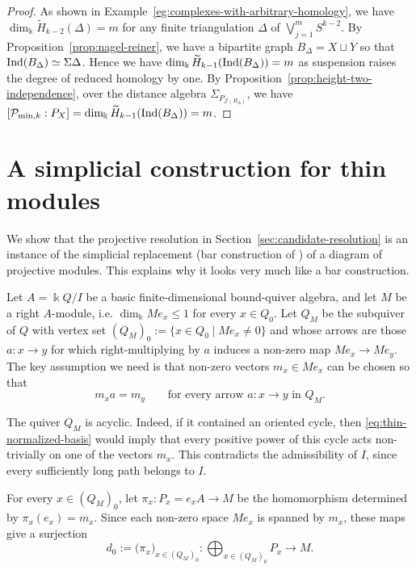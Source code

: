 \documentclass[a4paper,leqno]{amsart}
\begin{document}
\begin{proof}
As shown in Example~\ref{eg:complexes-with-arbitrary-homology}, we have $\dim_{\Bbbk}\widetilde H_{k-2}(\Delta)=m$ for any finite triangulation $\Delta$ of $\bigvee_{j=1}^m S^{k-2}$.  By Proposition~\ref{prop:nagel-reiner}, we have a bipartite graph $B_\Delta=X\sqcup Y$ so that $\operatorname{Ind}(B_\Delta)\simeq \Sigma \Delta$.  
Hence we have $\dim_{\Bbbk}\widetilde H_{k-1}(\operatorname{Ind}(B_\Delta))=m$ as suspension raises the degree of reduced homology by one. 
By Proposition~\ref{prop:height-two-independence}, over the distance algebra $\Sigma_{P_{\mathcal{J}(B_\Delta)}}$, we have $[\mathcal P_{\min,k}:P_X]=\dim_{\Bbbk}\widetilde H_{k-1}(\operatorname{Ind}(B_\Delta))=m$.
\end{proof}

\appendix

\section{A simplicial construction for thin modules}
\label{app:thin-modules}

We show that the projective resolution in Section~\ref{sec:candidate-resolution} is an instance of the simplicial replacement (bar construction of \cite[Definition 4.2.1]{Rie14}) of a diagram of projective modules.
This explains why it looks very much like a bar construction. 

Let $A=\Bbbk Q/I$ be a basic finite-dimensional bound-quiver algebra, and let $M$ be a  right $A$-module, i.e. $\dim_{\Bbbk}Me_x\leq1$ for every $x\in Q_0$.  Let $Q_M$ be the subquiver of $Q$ with vertex set $(Q_M)_0:=\{x\in Q_0\mid Me_x\neq0\}$ and whose arrows are those $a:x\to y$ for which right-multiplying by $a$ induces a non-zero map $Me_x\to Me_y$.  The key assumption we need is that non-zero vectors $m_x\in Me_x$ can be chosen so that
\begin{equation}
m_x a=m_y
\qquad
\text{for every arrow $a:x\to y$ in $Q_M$}.
\label{eq:thin-normalized-basis}
\end{equation}

The quiver $Q_M$ is acyclic.  Indeed, if it contained an oriented cycle, then \eqref{eq:thin-normalized-basis} would imply that every positive power of this cycle acts non-trivially on one of the vectors $m_x$.  This contradicts the admissibility of $I$, since every sufficiently long path belongs to $I$.

For every $x\in(Q_M)_0$, let $\pi_x\colon P_x=e_xA\to M$ be the homomorphism determined by $\pi_x(e_x)=m_x$.  Since each non-zero space $Me_x$ is spanned by $m_x$, these maps give a surjection
\begin{equation}\label{eq: pi to M}
d_0:=\bigl(\pi_x\bigr)_{x\in(Q_M)_0}\colon
\bigoplus_{x\in(Q_M)_0}P_x\to M.
\end{equation}
\end{document}

